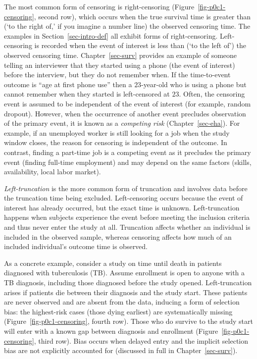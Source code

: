 \documentclass[
  letterpaper,
  krantz2]{style/krantz}
\begin{document}
The most common form of censoring is
right-censoring (Figure~\ref{fig-p0c1-censoring},
second row), which occurs when the true survival time is greater than
(`to the right of,' if you imagine a number line) the observed censoring
time. The examples in Section~\ref{sec-intro-def} all exhibit forms of
right-censoring. Left-censoring is recorded when
the event of interest is less than (`to the left of') the observed
censoring time. Chapter~\ref{sec-surv} provides an example of someone
telling an interviewer that they started using a phone (the event of
interest) before the interview, but they do not remember when. If the
time-to-event outcome is ``age at first phone use'' then a
\(23\)-year-old who is using a phone but cannot remember when they
started is left-censored at \(23\). Often, the censoring event is
assumed to be independent of the event of interest (for example, random
dropout). However, when the occurrence of another event precludes
observation of the primary event, it is known as a \emph{competing
risk} (Chapter~\ref{sec-eha}). For example, if an
unemployed worker is still looking for a job when the study window
closes, the reason for censoring is independent of the
outcome. In contrast, finding a part-time
job is a competing event as it precludes the primary event (finding
full-time employment) and may depend on the same factors (skills,
availability, local labor market).

\emph{Left-truncation} is the more common form of
truncation and involves data before the truncation time being excluded.
Left-censoring occurs because the event of interest has already
occurred, but the exact time is unknown. Left-truncation happens when
subjects experience the event before meeting the inclusion criteria and
thus never enter the study at all. Truncation affects whether an
individual is included in the observed sample, whereas censoring affects
how much of an included individual's outcome time is observed.

As a concrete example, consider a study on time until death in patients
diagnosed with tuberculosis (TB). Assume enrollment is open to anyone
with a TB diagnosis, including those diagnosed before the study opened.
Left-truncation arises if patients die between their diagnosis and the
study start. These patients are never observed and are absent from the
data, inducing a form of selection bias: the highest-risk cases (those
dying earliest) are systematically missing
(Figure~\ref{fig-p0c1-censoring}, fourth row). Those who do survive to
the study start will enter with a known gap between diagnosis and
enrollment (Figure~\ref{fig-p0c1-censoring}, third row).
Bias occurs when delayed entry and the implicit
selection bias are not explicitly accounted for (discussed in full in
Chapter~\ref{sec-surv}).
\end{document}

